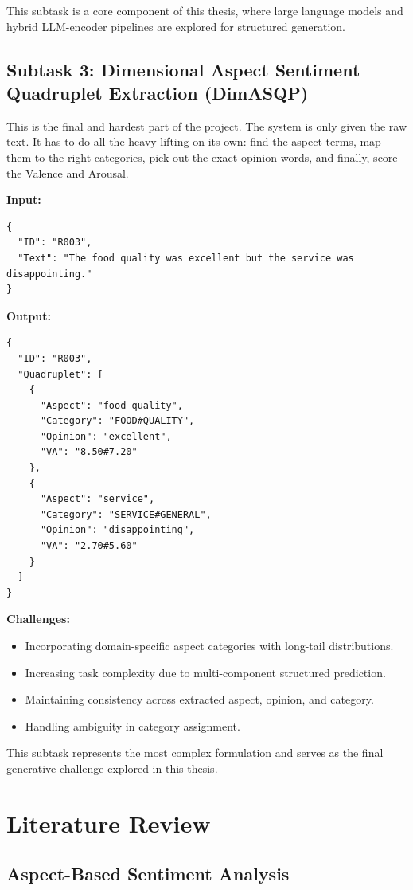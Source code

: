 \documentclass{article}
\begin{document}
This subtask is a core component of this thesis, where large language models and hybrid LLM-encoder pipelines are explored for structured generation.

\subsection{Subtask 3: Dimensional Aspect Sentiment Quadruplet Extraction (DimASQP)}

This is the final and hardest part of the project. The system is only given the raw text. It has to do all the heavy lifting on its own: find the aspect terms, map them to the right categories, pick out the exact opinion words, and finally, score the Valence and Arousal. 

\textbf{Input:}
\begin{verbatim}
{
  "ID": "R003",
  "Text": "The food quality was excellent but the service was disappointing."
}
\end{verbatim}

\textbf{Output:}
\begin{verbatim}
{
  "ID": "R003",
  "Quadruplet": [
    {
      "Aspect": "food quality",
      "Category": "FOOD#QUALITY",
      "Opinion": "excellent",
      "VA": "8.50#7.20"
    },
    {
      "Aspect": "service",
      "Category": "SERVICE#GENERAL",
      "Opinion": "disappointing",
      "VA": "2.70#5.60"
    }
  ]
}
\end{verbatim}

\textbf{Challenges:}
\begin{itemize}
    \item Incorporating domain-specific aspect categories with long-tail distributions.
    \item Increasing task complexity due to multi-component structured prediction.
    \item Maintaining consistency across extracted aspect, opinion, and category.
    \item Handling ambiguity in category assignment.
\end{itemize}

This subtask represents the most complex formulation and serves as the final generative challenge explored in this thesis.


\section{Literature Review}
\label{sec:literature}

\subsection{Aspect-Based Sentiment Analysis}
\end{document}
